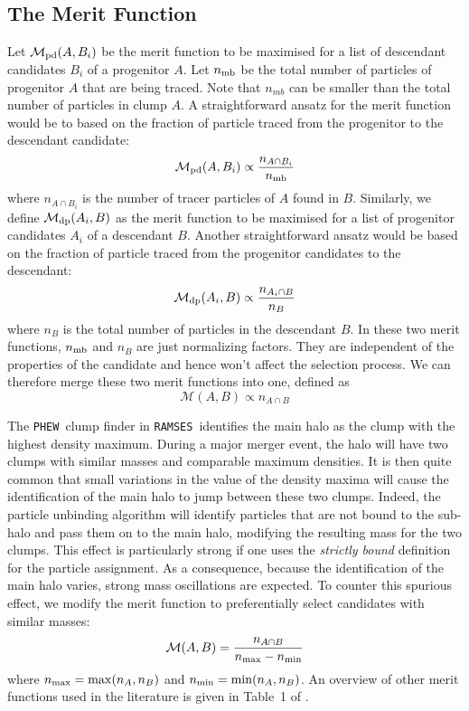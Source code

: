 \documentclass[a4paper,twocolumn,fleqn,usenatbib]{mnras}
\newcommand{\ramses}{\texttt{RAMSES}}
\newcommand{\phew}{\texttt{PHEW}}
\begin{document}
\subsection{The Merit Function}

Let $\mathcal{M}_{\rm pd}(A,B_i)$ be the merit function to be
maximised for a list of descendant candidates $B_i$ of a progenitor
$A$. Let $n_{\rm mb}$ be the total number of particles of progenitor
$A$ that are being traced. Note that $n_{mb}$ can be smaller than the
total number of particles in clump $A$.  A straightforward ansatz for
the merit function would be to based on the fraction of particle traced from the
progenitor to the descendant candidate:
\begin{equation}
\mathcal{M}_{\rm pd}(A,B_i) \propto \frac{n_{A \cap B_i}}{n_{\rm mb}}
\end{equation}
where $n_{A \cap B_i}$ is the number of tracer particles of $A$ found
in $B$.  Similarly, we define $\mathcal{M}_{\rm dp}(A_i,B)$ as the
merit function to be maximised for a list of progenitor candidates
$A_i$ of a descendant $B$. Another straightforward ansatz would be
based on the fraction of particle traced from the progenitor
candidates to the descendant:
\begin{equation}
\mathcal{M}_{\rm dp}(A_i,B) \propto \frac{n_{A_i \cap B}}{n_B}
\end{equation}
where $n_B$ is the total number of particles in the descendant $B$.
In these two merit functions, $n_{\rm mb}$ and $n_B$ are just
normalizing factors. They are independent of the properties of the
candidate and hence won't affect the selection process.  We can
therefore merge these two merit functions into one, defined as
\begin{equation}
\mathcal{M}(A,B) \propto n_{A \cap B}
\end{equation}

The \phew\ clump finder in \ramses\ identifies the main halo as the
clump with the highest density maximum.  During a major merger event,
the halo will have two clumps with similar masses and comparable
maximum densities.  It is then quite common that small variations in
the value of the density maxima will cause the identification of the
main halo to jump between these two clumps.  Indeed, the particle
unbinding algorithm will identify particles that are not bound to the
sub-halo and pass them on to the main halo, modifying the resulting
mass for the two clumps.  This effect is particularly strong if one
uses the {\it strictly bound} definition for the particle
assignment. As a consequence, because the identification of the main
halo varies, strong mass oscillations are expected. To counter this
spurious effect, we modify the merit function to preferentially select candidates with
similar masses:
\begin{equation}
\mathcal{M}(A,B) = \frac{n_{A \cap B}}{n_{\rm max} - n_{\rm min}} \label{eq:merit}
\end{equation}
where $n_{\rm max}=\max(n_A,n_B)$ and $n_{\rm min}=\min(n_A,n_B)$.  An
overview of other merit functions used in the literature is given in
Table~1 of \cite{SUSSING_COMPARISON}.
\end{document}
